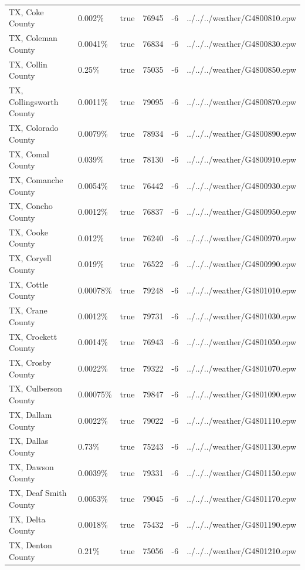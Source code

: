 \begin{longtable}[]{@{}llllll@{}}
TX, Coke County & 0.002\% & true & 76945 & -6 &
../../../weather/G4800810.epw \\
TX, Coleman County & 0.0041\% & true & 76834 & -6 &
../../../weather/G4800830.epw \\
TX, Collin County & 0.25\% & true & 75035 & -6 &
../../../weather/G4800850.epw \\
TX, Collingsworth County & 0.0011\% & true & 79095 & -6 &
../../../weather/G4800870.epw \\
TX, Colorado County & 0.0079\% & true & 78934 & -6 &
../../../weather/G4800890.epw \\
TX, Comal County & 0.039\% & true & 78130 & -6 &
../../../weather/G4800910.epw \\
TX, Comanche County & 0.0054\% & true & 76442 & -6 &
../../../weather/G4800930.epw \\
TX, Concho County & 0.0012\% & true & 76837 & -6 &
../../../weather/G4800950.epw \\
TX, Cooke County & 0.012\% & true & 76240 & -6 &
../../../weather/G4800970.epw \\
TX, Coryell County & 0.019\% & true & 76522 & -6 &
../../../weather/G4800990.epw \\
TX, Cottle County & 0.00078\% & true & 79248 & -6 &
../../../weather/G4801010.epw \\
TX, Crane County & 0.0012\% & true & 79731 & -6 &
../../../weather/G4801030.epw \\
TX, Crockett County & 0.0014\% & true & 76943 & -6 &
../../../weather/G4801050.epw \\
TX, Crosby County & 0.0022\% & true & 79322 & -6 &
../../../weather/G4801070.epw \\
TX, Culberson County & 0.00075\% & true & 79847 & -6 &
../../../weather/G4801090.epw \\
TX, Dallam County & 0.0022\% & true & 79022 & -6 &
../../../weather/G4801110.epw \\
TX, Dallas County & 0.73\% & true & 75243 & -6 &
../../../weather/G4801130.epw \\
TX, Dawson County & 0.0039\% & true & 79331 & -6 &
../../../weather/G4801150.epw \\
TX, Deaf Smith County & 0.0053\% & true & 79045 & -6 &
../../../weather/G4801170.epw \\
TX, Delta County & 0.0018\% & true & 75432 & -6 &
../../../weather/G4801190.epw \\
TX, Denton County & 0.21\% & true & 75056 & -6 &
../../../weather/G4801210.epw \\

\end{longtable}
